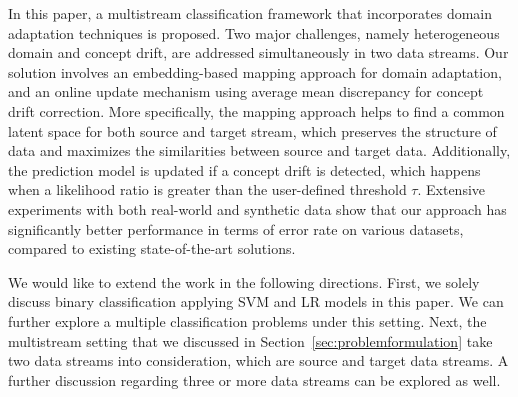 In this paper, a multistream classification framework that incorporates domain adaptation techniques is proposed. Two major challenges, namely heterogeneous domain and concept drift, are addressed simultaneously in two data streams.
Our solution involves an embedding-based mapping approach for domain adaptation, and an online update mechanism using average mean discrepancy for concept drift correction.
More specifically, the mapping approach helps to find a common latent space for both source and target stream, which preserves the structure of data and maximizes the similarities between source and target data.
Additionally, the prediction model is updated if a concept drift is detected, which happens when a likelihood ratio is greater than the user-defined threshold $\tau$.
Extensive experiments with both real-world and synthetic data show that our approach has significantly better performance in terms of error rate on various datasets, compared to existing state-of-the-art solutions.

We would like to extend the work in the following directions. First, we solely discuss binary classification applying SVM and LR models in this paper. We can further explore a multiple classification problems under this setting. Next, the multistream setting that we discussed in Section~\ref{sec:problemformulation} take two data streams into consideration, which are source and target data streams. A further discussion regarding three or more data streams can be explored as well. 